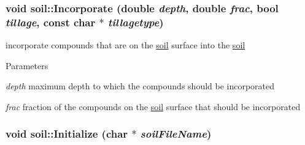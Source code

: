 \label{classsoil_a06c73f2cfdba2d776e2ac58ba8894c0b}
\hypertarget{classsoil_a0fcdb4597cdf9804bcb5608a6d99ea5d}{
\subsubsection[{Incorporate}]{\setlength{\rightskip}{0pt plus 5cm}void soil::Incorporate (double {\em depth}, \/  double {\em frac}, \/  bool {\em tillage}, \/  const char $\ast$ {\em tillagetype})}}
\label{classsoil_a0fcdb4597cdf9804bcb5608a6d99ea5d}


incorporate compounds that are on the \hyperlink{classsoil}{soil} surface into the \hyperlink{classsoil}{soil} 
\begin{DoxyParams}{Parameters}
\item[{\em depth}]maximum depth to which the compounds should be incorporated \item[{\em frac}]fraction of the compounds on the \hyperlink{classsoil}{soil} surface that should be incorporated \end{DoxyParams}
\hypertarget{classsoil_ae5f6d74641b63e3c8bd9519bd7ca757c}{
\subsubsection[{Initialize}]{\setlength{\rightskip}{0pt plus 5cm}void soil::Initialize (char $\ast$ {\em soilFileName})}}
\label{classsoil_ae5f6d74641b63e3c8bd9519bd7ca757c}


